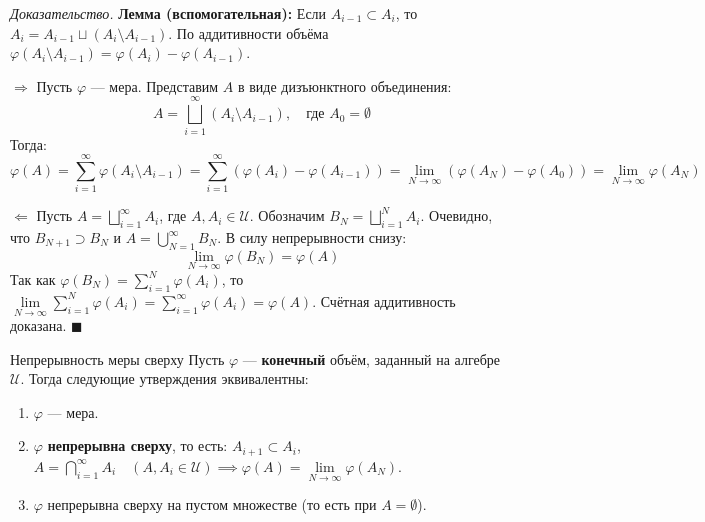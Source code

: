 \documentclass[12pt,a4paper]{article}
\newenvironment{Proof}[1][Доказательство]{\vspace{0.5em}\noindent\textit{#1.}\hspace{0.5em}\ignorespaces}{\hfill$\blacksquare$\vspace{1em}}
\begin{document}
\begin{Proof}
\textbf{Лемма (вспомогательная):} Если $A_{i-1} \subset A_i$, то $A_i = A_{i-1} \sqcup (A_i \setminus A_{i-1})$. По аддитивности объёма $\varphi(A_i \setminus A_{i-1}) = \varphi(A_i) - \varphi(A_{i-1})$.

$\Rightarrow$ Пусть $\varphi$ — мера. Представим $A$ в виде дизъюнктного объединения:
$$ A = \bigsqcup\limits_{i=1}^{\infty} (A_i \setminus A_{i-1}), \quad \text{где } A_0 = \emptyset $$
Тогда:
$$ \varphi(A) = \sum\limits_{i=1}^{\infty} \varphi(A_i \setminus A_{i-1}) = \sum\limits_{i=1}^{\infty} (\varphi(A_i) - \varphi(A_{i-1})) = \lim\limits_{N \to \infty} (\varphi(A_N) - \varphi(A_0)) = \lim\limits_{N \to \infty} \varphi(A_N) $$

$\Leftarrow$ Пусть $A = \bigsqcup\limits_{i=1}^{\infty} A_i$, где $A, A_i \in \mathcal{U}$. Обозначим $B_N = \bigsqcup\limits_{i=1}^N A_i$.
Очевидно, что $B_{N+1} \supset B_N$ и $A = \bigcup\limits_{N=1}^{\infty} B_N$. В силу непрерывности снизу:
$$ \lim\limits_{N \to \infty} \varphi(B_N) = \varphi(A) $$
Так как $\varphi(B_N) = \sum\limits_{i=1}^N \varphi(A_i)$, то $\lim\limits_{N \to \infty} \sum\limits_{i=1}^N \varphi(A_i) = \sum\limits_{i=1}^{\infty} \varphi(A_i) = \varphi(A)$. Счётная аддитивность доказана.
\end{Proof}

\begin{center}
\end{center}

\begin{Theorem}{Непрерывность меры сверху}{}
Пусть $\varphi$ — \textbf{конечный} объём, заданный на алгебре $\mathcal{U}$. Тогда следующие утверждения эквивалентны:
\begin{enumerate}
    \item $\varphi$ — мера.
    \item $\varphi$ \textbf{непрерывна сверху}, то есть: $A_{i+1} \subset A_i$, $A = \bigcap\limits_{i=1}^{\infty} A_i \quad (A, A_i \in \mathcal{U}) \implies \varphi(A) = \lim\limits_{N \to \infty} \varphi(A_N)$.
    \item $\varphi$ непрерывна сверху на пустом множестве (то есть при $A = \emptyset$).
\end{enumerate}
\end{Theorem}
\end{document}
